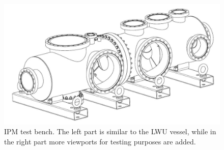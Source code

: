 \begin{figure}[!ht]
	\begin{center}
		\includegraphics[width=\textwidth]{04_IPHI_Test/figures/fig000_Testbench.png}
	\end{center}
	\caption[IPM test bench]{IPM test bench. The left part is similar to the LWU vessel, while in the right part more viewports for testing purposes are added.}
	\label{chap4:Testbench}
\end{figure}
